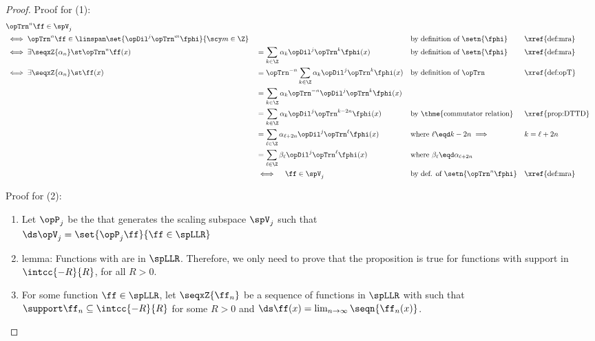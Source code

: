 \begin{proof}
Proof for (1):
\begin{align*}
  &\opTrn^n\ff\in\spV_j
  \\&\iff \opTrn^n\ff\in\linspan\set{\opDil^j\opTrn^m\fphi}{\scy m\in\Z}
          &&
          && \text{by definition of $\setn{\fphi}$} && \text{\xref{def:mra}}
  \\&\iff \exists \seqxZ{\alpha_n} \st \opTrn^n\ff(x)
          &&= \sum_{k\in\Z}\alpha_k\opDil^j\opTrn^k\fphi(x)
          && \text{by definition of $\setn{\fphi}$} && \text{\xref{def:mra}}
  \\&\iff \exists \seqxZ{\alpha_n} \st \ff(x)
          &&= \opTrn^{-n}\sum_{k\in\Z}\alpha_k\opDil^j\opTrn^k\fphi(x)
          && \text{by definition of $\opTrn$} && \text{\xref{def:opT}}
  \\&     &&= \sum_{k\in\Z}\alpha_k\opTrn^{-n}\opDil^j\opTrn^k\fphi(x)
  \\&     &&= \sum_{k\in\Z}\alpha_k\opDil^j\opTrn^{k-2n}\fphi(x)
          && \text{by \thme{commutator relation}} && \text{\xref{prop:DTTD}}
  \\&     &&= \sum_{\ell\in\Z}\alpha_{\ell+2n}\opDil^j\opTrn^{\ell}\fphi(x)
          && \text{where $\ell\eqd k-2n\implies$} &&k=\ell+2n
  \\&     &&= \sum_{\ell\in\Z}\beta_{\ell}\opDil^j\opTrn^{\ell}\fphi(x)
          && \text{where $\beta_{\ell}\eqd\alpha_{\ell+2n}$}
  \\&     &&\iff \quad\ff\in\spV_j
          && \text{by def. of $\setn{\opTrn^n\fphi}$} && \text{\xref{def:mra}}
\end{align*}

Proof for (2):
\begin{enumerate}
  \item Let $\opP_j$ be the  that generates the scaling subspace $\spV_j$ such that \label{idef:mra_glb_Pj}
    \\\indentx$\ds\opV_j=\set{\opP_j\ff}{\ff\in\spLLR}$

  \item lemma: Functions with  are  in $\spLLR$.
        \label{ilem:mra_glb_dense}
        Therefore, we only need to prove that the proposition is true for functions with support in $\intcc{-R}{R}$, for all $R>0$.

  \item For some function $\ff\in\spLLR$, let $\seqxZ{\ff_n}$ be a sequence of functions in $\spLLR$ 
        with  such that
        \\\indentx
        $\support\ff_n\subseteq\intcc{-R}{R}$ for some $R>0$
        \quad and\quad
        $\ds\ff(x)=\lim_{n\to\infty}\seqn{\ff_n(x)}$.
        \label{idef:mra_glb_ffn}


\end{enumerate}
\end{proof}
